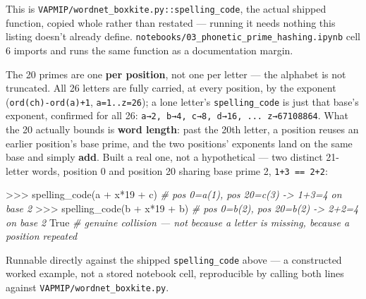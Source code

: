 \documentclass[
  10pt,
]{article}
\newenvironment{Shaded}{}{}
\newcommand{\CommentTok}[1]{\textcolor[rgb]{0.38,0.63,0.69}{\textit{#1}}}
\newcommand{\DecValTok}[1]{\textcolor[rgb]{0.25,0.63,0.44}{#1}}
\newcommand{\NormalTok}[1]{#1}
\newcommand{\OperatorTok}[1]{\textcolor[rgb]{0.40,0.40,0.40}{#1}}
\newcommand{\StringTok}[1]{\textcolor[rgb]{0.25,0.44,0.63}{#1}}
\newcommand{\VariableTok}[1]{\textcolor[rgb]{0.10,0.09,0.49}{#1}}
\begin{document}
This is \texttt{VAPMIP/wordnet\_boxkite.py::spelling\_code}, the actual
shipped function, copied whole rather than restated --- running it needs
nothing this listing doesn't already define.
\texttt{notebooks/03\_phonetic\_prime\_hashing.ipynb} cell 6 imports and
runs the same function as a documentation margin.

The 20 primes are one \textbf{per position}, not one per letter --- the
alphabet is not truncated. All 26 letters are fully carried, at every
position, by the exponent
(\texttt{ord(ch)-ord(\textquotesingle{}a\textquotesingle{})+1},
\texttt{a=1..z=26}); a lone letter's \texttt{spelling\_code} is just
that base's exponent, confirmed for all 26:
\texttt{a→2,\ b→4,\ c→8,\ d→16,\ ...\ z→67108864}. What the 20 actually
bounds is \textbf{word length}: past the 20th letter, a position reuses
an earlier position's base prime, and the two positions' exponents land
on the same base and simply \textbf{add}. Built a real one, not a
hypothetical --- two distinct 21-letter words, position 0 and position
20 sharing base prime 2, \texttt{1+3\ ==\ 2+2}:

\begin{Shaded}
\begin{Highlighting}[]
\OperatorTok{\textgreater{}\textgreater{}\textgreater{}}\NormalTok{ spelling\_code(}\StringTok{\textquotesingle{}a\textquotesingle{}} \OperatorTok{+} \StringTok{\textquotesingle{}x\textquotesingle{}}\OperatorTok{*}\DecValTok{19} \OperatorTok{+} \StringTok{\textquotesingle{}c\textquotesingle{}}\NormalTok{)   }\CommentTok{\# pos 0=\textquotesingle{}a\textquotesingle{}(1), pos 20=\textquotesingle{}c\textquotesingle{}(3) {-}\textgreater{} 1+3=4 on base 2}
\OperatorTok{\textgreater{}\textgreater{}\textgreater{}}\NormalTok{ spelling\_code(}\StringTok{\textquotesingle{}b\textquotesingle{}} \OperatorTok{+} \StringTok{\textquotesingle{}x\textquotesingle{}}\OperatorTok{*}\DecValTok{19} \OperatorTok{+} \StringTok{\textquotesingle{}b\textquotesingle{}}\NormalTok{)   }\CommentTok{\# pos 0=\textquotesingle{}b\textquotesingle{}(2), pos 20=\textquotesingle{}b\textquotesingle{}(2) {-}\textgreater{} 2+2=4 on base 2}
\VariableTok{True}   \CommentTok{\# genuine collision — not because a letter is missing, because a position repeated}
\end{Highlighting}
\end{Shaded}

Runnable directly against the shipped \texttt{spelling\_code} above ---
a constructed worked example, not a stored notebook cell, reproducible
by calling both lines against \texttt{VAPMIP/wordnet\_boxkite.py}.
\end{document}
